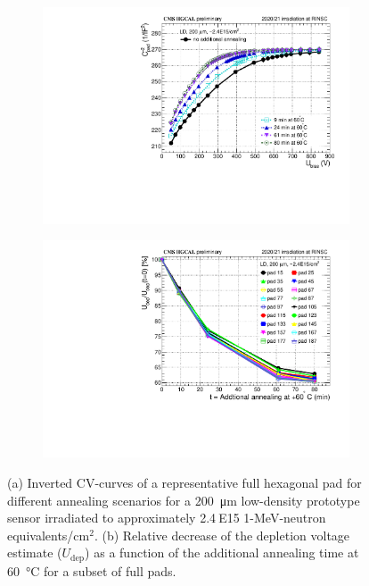 \begin{figure}
	\captionsetup[subfigure]{aboveskip=-1pt,belowskip=-1pt}
	\centering

	\begin{subfigure}[b]{0.49\textwidth}
		\includegraphics[width=0.999\textwidth]{plots/annealing_Vdep/annealing_CV_ch24.pdf}
		\subcaption{
		}
        \label{plot:annealing_CV}
	\end{subfigure}
    \hfill
    \begin{subfigure}[b]{0.49\textwidth}
		\includegraphics[width=0.999\textwidth]{plots/annealing_Vdep/annealing_Vdep.pdf}
		\subcaption{
		}		
        \label{plot:annealing_Vdep}
	\end{subfigure}
	\caption{
        (a) Inverted CV-curves of a representative full hexagonal pad for different annealing scenarios for a \SI{200}{\micro\metre} low-density prototype sensor irradiated to approximately 2.4$~$E15 1-MeV-neutron equivalents/cm$^{2}$.   
		(b) Relative decrease of the depletion voltage estimate ($U_\text{dep}$) as a function of the additional annealing time at \SI{60}{\celsius} for a subset of full pads.
	}
\end{figure}


